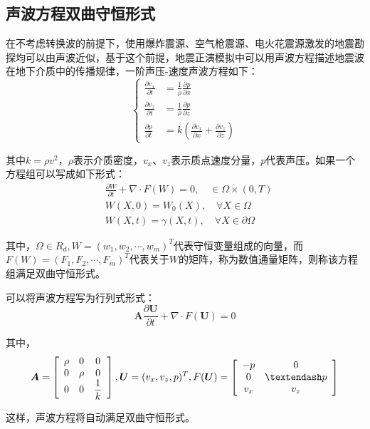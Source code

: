 \documentclass[12pt]{article}
\begin{document}
\subsection{声波方程双曲守恒形式}
在不考虑转换波的前提下，使用爆炸震源、空气枪震源、电火花震源激发的地震勘探均可以由声波近似，基于这个前提，地震正演模拟中可以用声波方程描述地震波在地下介质中的传播规律，一阶声压-速度声波方程如下：
\begin{equation}\label{2-1}
\left\{ 
\begin{aligned}
\frac{\partial v_x}{\partial t} & = \frac{1}{\rho}\frac{\partial p}{\partial x}\\
\frac{\partial v_z}{\partial t} & = \frac{1}{\rho}\frac{\partial p}{\partial z}\\
\frac{\partial p}{\partial t} & = k(\frac{\partial v_x}{\partial x}+\frac{\partial v_z}{\partial z})
\end{aligned}
\right.
\end{equation}
\par
其中$k=\rho v^2$，$\rho$表示介质密度，$v_x$、$v_z$表示质点速度分量，$p$代表声压。如果一个方程组可以写成如下形式：
\begin{equation}\label{2-2}
\begin{aligned}
&\frac{\partial W}{\partial t}+\nabla \cdot F(W)=0,\quad \in \Omega \times (0,T)\\
&W(X,0)=W_0(X),\quad \forall X \in \Omega\\
&W(X,t)=\gamma(X,t),\quad \forall X \in \partial \Omega
\end{aligned}
\end{equation}
\par
其中，$\Omega \in R_d,W=(w_1,w_2,\cdots,w_m)^T$代表守恒变量组成的向量，而$F(W)=(F_1,F_2,\cdots,F_m)^T$代表关于$W$的矩阵，称为数值通量矩阵，则称该方程组满足双曲守恒形式。
\par
可以将声波方程写为行列式形式：
\begin{equation}\label{2-3}
\boldsymbol{A}\frac{\partial \boldsymbol{U}}{\partial t}+\nabla \cdot F(\boldsymbol{U})=0
\end{equation}
\par
其中，
\begin{equation*}
\boldsymbol{A}=\left [ 
\begin{array}{>{\displaystyle}c>{\displaystyle}c>{\displaystyle}c}
\rho & 0 & 0\\
0 & \rho & 0\\
0 & 0 & \frac{1}{k} 
\end{array} 
\right ],
\boldsymbol{U}=(v_x,v_z,p)^T,F(\boldsymbol{U})=\left[ \begin{array}{>{\displaystyle}c>{\displaystyle}c>{\displaystyle}c}
-p & 0\\0 & –p\\v_x & v_z 
\end{array} 
\right]
\end{equation*}
\par
这样，声波方程将自动满足双曲守恒形式。
\end{document}
